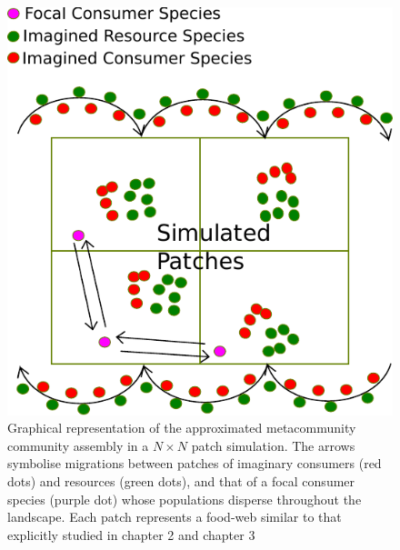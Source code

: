 \documentclass[a4paper]{report}
\begin{document}
{\begin{figure}[H]
\centering{}
\includegraphics[scale=1]{../Images/topology_3.pdf}
\caption{Graphical representation of the approximated metacommunity community assembly in a $N \times N$ patch simulation. The arrows symbolise migrations between patches of imaginary consumers (red dots) and resources (green dots), and that of a focal consumer species (purple dot) whose populations disperse throughout the landscape. Each patch represents a food-web similar to that explicitly studied in chapter 2 and chapter 3 \label{fig:topology_3}}
\end{figure}

}
\end{document}
